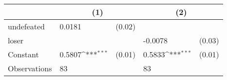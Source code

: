 {
\def\sym#1{\ifmmode^{#1}\else\(^{#1}\)\fi}
\begin{tabular*}{.7\hsize}{@{\hskip\tabcolsep\extracolsep\fill}l*{2}{lc}}
\toprule
                &\multicolumn{2}{c}{(1)}     &\multicolumn{2}{c}{(2)}     \\
\midrule
undefeated      &   0.0181         &   (0.02)&                  &         \\
loser           &                  &         &  -0.0078         &   (0.03)\\
Constant        &   0.5807\sym{***}&   (0.01)&   0.5833\sym{***}&   (0.01)\\
\midrule
Observations    &       83         &         &       83         &         \\
\bottomrule
\end{tabular*}
}
